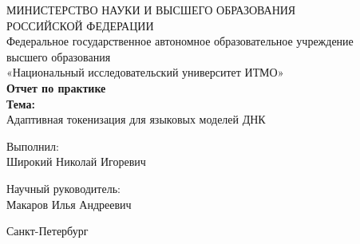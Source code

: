 \begin{titlepage}
  \begin{center}
    \small
    МИНИСТЕРСТВО НАУКИ И ВЫСШЕГО ОБРАЗОВАНИЯ\\
    РОССИЙСКОЙ ФЕДЕРАЦИИ\\[0.5em]
    Федеральное государственное автономное образовательное учреждение\\
    высшего образования\\
    «Национальный исследовательский университет ИТМО»\\[2em]

    \textbf{Отчет по практике}\\

    \textbf{Тема:}\\[0.5em]
    \large Адаптивная токенизация для языковых моделей ДНК
  \end{center}

  \vfill

  \noindent
  \begin{minipage}[t]{0.48\textwidth}
    \raggedright
    Выполнил:\\
    Широкий Николай Игоревич
  \end{minipage}
  \hfill
  \begin{minipage}[t]{0.48\textwidth}
    \raggedleft
    Научный руководитель:\\
    Макаров Илья Андреевич
  \end{minipage}

  \vfill

  \begin{center}
    Санкт-Петербург\\
    \the\year
  \end{center}
\end{titlepage}
